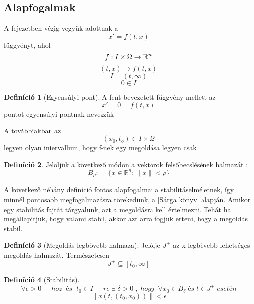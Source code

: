 \documentclass{article}
\theoremstyle{definition}
\theoremstyle{theorem}
\newtheorem{definition}{Definíció}
\begin{document}
\subsection{Alapfogalmak}
A fejezetben végig vegyük adottnak a 
\begin{equation*}
    x' = f(t,x)
\end{equation*}
függvényt, ahol 
\begin{equation*}
    f: I \times \Omega \rightarrow \mathbb{R}^n \\
\end{equation*}
\begin{equation*}
    (t,x) \rightarrow f(t,x)
\end{equation*}
\begin{equation*}
    I=(t,\infty)
\end{equation*}
\begin{equation*}
    0 \in I
\end{equation*}
\begin{definition}[Egyensúlyi pont]
A fent bevezetett függvény mellett az
\begin{equation*}
    x' = 0 = f(t,x)
\end{equation*}
pontot egyensúlyi pontnak nevezzük
\end{definition}
A továbbiakban az 
\begin{equation*}
    (x_0,t_o) \in I \times \Omega 
\end{equation*}
legyen olyan intervallum, hogy f-nek egy megoldása legyen csak

\begin{definition}
Jelöljük a következő módon a vektorok felsőbecslésének halmazát :
\begin{equation*}
    B_{\rho} : = \{ x \in \mathbb{R}^n: \lVert x \rVert < \rho \}
\end{equation*}
\end{definition}
A következő néhány definíció fontos alapfogalmai a stabilitáselméletnek, így minnél pontosabb megfogalmazásra törekedünk, a [Sárga könyv] alapján. Amikor egy stabilitás fajtát tárgyalunk, azt a megoldásra kell értelmezni. Tehát ha megállapítjuk, hogy valami stabil, akkor azt arra fogjuk érteni, hogy a megoldás stabil.
\begin{definition}[Megoldás legbővebb halmaza]
Jelölje $J^+$ az x legbővebb lehetséges megoldás halmazát. Természetesen
\begin{equation*}
    J^+ \subseteq [t_0, \infty]
\end{equation*}
\end{definition}
\begin{definition} [Stabilitás]
\begin{equation*}
    \forall \epsilon > 0 \;-hoz\;\;és\;\;t_0 \in I \;-re\; \exists\;
    \delta >0\;,\;hogy\;\; \forall x_0 \in B_{\delta} \;és\; t \in J^+ \;esetén
\end{equation*}
\begin{equation*}
    \lVert x(t,(t_0,x_0)) \rVert < \epsilon
\end{equation*}
\end{definition}
\end{document}
